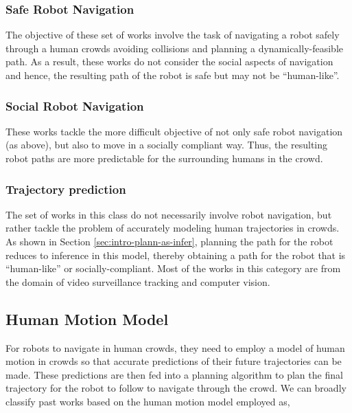 \subsubsection{Safe Robot Navigation}
\label{sec:survey-safe-robot-navig}

The objective of these set of works involve the task of navigating a robot safely through a human crowds avoiding collisions and planning a dynamically-feasible path. As a result, these works do not consider the social aspects of navigation and hence, the resulting path of the robot is safe but may not be ``human-like''.

\subsubsection{Social Robot Navigation}
\label{sec:survey-soci-robot-navig}

These works tackle the more difficult objective of not only safe robot navigation (as above), but also to move in a socially compliant way. Thus, the resulting robot paths are more predictable for the surrounding humans in the crowd.

\subsubsection{Trajectory prediction}
\label{sec:survey-traj-pred}

The set of works in this class do not necessarily involve robot navigation, but rather tackle the problem of accurately modeling human trajectories in crowds. As shown in Section \ref{sec:intro-plann-as-infer}, planning the path for the robot reduces to inference in this model, thereby obtaining a path for the robot that is ``human-like'' or socially-compliant. Most of the works in this category are from the domain of video surveillance tracking and computer vision.



\subsection{Human Motion Model}
\label{sec:survey-human-motion-model}

For robots to navigate in human crowds, they need to employ a model of human motion in crowds so that accurate predictions of their future trajectories can be made. These predictions are then fed into a planning algorithm to plan the final trajectory for the robot to follow to navigate through the crowd. We can broadly classify past works based on the human motion model employed as,


